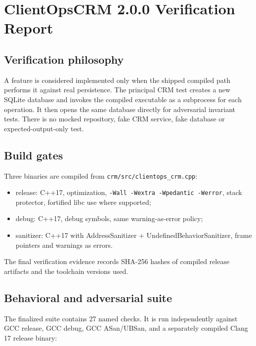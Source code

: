 \documentclass[
]{article}
\author{}
\date{}
\providecommand{\tightlist}{%
  \setlength{\itemsep}{0pt}\setlength{\parskip}{0pt}}
\begin{document}
\section{ClientOpsCRM 2.0.0 Verification
Report}\label{clientopscrm-200-verification-report}

\subsection{Verification philosophy}\label{verification-philosophy}

A feature is considered implemented only when the shipped compiled path
performs it against real persistence. The principal CRM test creates a
new SQLite database and invokes the compiled executable as a subprocess
for each operation. It then opens the same database directly for
adversarial invariant tests. There is no mocked repository, fake CRM
service, fake database or expected-output-only test.

\subsection{Build gates}\label{build-gates}

Three binaries are compiled from \texttt{crm/src/clientops\_crm.cpp}:

\begin{itemize}
\tightlist
\item
  release: C++17, optimization,
  \texttt{-Wall\ -Wextra\ -Wpedantic\ -Werror}, stack protector,
  fortified libc use where supported;
\item
  debug: C++17, debug symbols, same warning-as-error policy;
\item
  sanitizer: C++17 with AddressSanitizer + UndefinedBehaviorSanitizer,
  frame pointers and warnings as errors.
\end{itemize}

The final verification evidence records SHA-256 hashes of compiled
release artifacts and the toolchain versions used.

\subsection{Behavioral and adversarial
suite}\label{behavioral-and-adversarial-suite}

The finalized suite contains 27 named checks. It is run independently
against GCC release, GCC debug, GCC ASan/UBSan, and a separately
compiled Clang 17 release binary:
\end{document}
